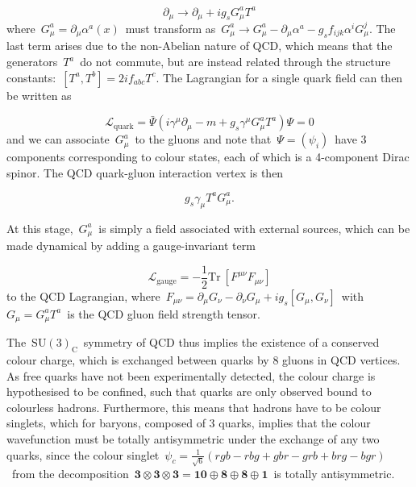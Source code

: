 \begin{equation}
\label{eq:theory_qcd_deriv}
\partial_\mu \rightarrow \partial_\mu + i g_s G^a_\mu T^a
\end{equation}
where~$G^a_\mu = \partial_\mu \alpha^a(x)$~must transform as~$G^a_\mu \rightarrow G^a_\mu - \partial_\mu \alpha^a - g_s f_{ijk} \alpha^i G^j_\mu$. The last term arises due to the non-Abelian nature of QCD, which means that the generators~$T^a$~do not commute, but are instead related through the structure constants:~$[T^a, T^b] = 2 i f_{abc} T^c$. The Lagrangian for a single quark field can then be written as

\begin{equation}
\label{eq:theory_quark_lagrangian}
\mathcal{L}_{\mathrm{quark}} = \bar{\Psi} (i \gamma^\mu \partial_\mu - m + g_s \gamma^\mu G^a_\mu T^a) \Psi = 0
\end{equation}
and we can associate~$G^a_\mu$~to the gluons and note that~$\Psi = (\psi_i)$~have 3 components corresponding to colour states, each of which is a 4-component Dirac spinor. The QCD quark-gluon interaction vertex is then

\begin{equation}
g_s \gamma_\mu T^a G^a_\mu.
\end{equation}

At this stage,~$G^a_\mu$~is simply a field associated with external sources, which can be made dynamical by adding a gauge-invariant term

\begin{equation}
\mathcal{L}_{\mathrm{gauge}} = - \frac{1}{2} \mathrm{Tr}\ [F^{\mu\nu} F_{\mu\nu}] 
\end{equation}
to the QCD Lagrangian, where~$F_{\mu\nu} = \partial_\mu G_\nu - \partial_\nu G_\mu + i g_s [G_\mu, G_\nu]$~with~$G_\mu = G_\mu^a T^a$~is the QCD gluon field strength tensor.

The~$\mathrm{SU}(3)_{\mathrm{C}}$~symmetry of QCD thus implies the existence of a conserved colour charge, which is exchanged between quarks by 8 gluons in QCD vertices. As free quarks have not been experimentally detected, the colour charge is hypothesised to be confined, such that quarks are only observed bound to colourless hadrons. Furthermore, this means that hadrons have to be colour singlets, which for baryons, composed of 3 quarks, implies that the colour wavefunction must be totally antisymmetric under the exchange of any two quarks, since the colour  singlet~$\psi_c = \frac{1}{\sqrt{6}} (rgb - rbg + gbr - grb + brg - bgr)$~from the decomposition~$\mathbf{3}\otimes \mathbf{3} \otimes \mathbf{3} = \mathbf{10} \oplus \mathbf{8} \oplus \mathbf{8} \oplus \mathbf{1}$~is totally antisymmetric.

